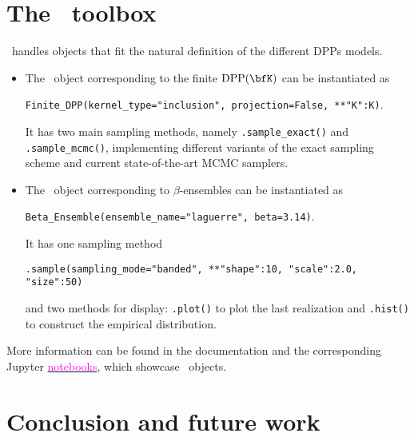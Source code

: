 \documentclass[twoside,11pt]{article}
\begin{document}



\section{The \DPPy\ toolbox} %
\label{sec:the_dppy_toolbox}

  \DPPy\ handles objects that fit the natural definition of the different DPPs models.
  \begin{itemize}
	  \item The \DPPy\ object corresponding to the finite $\DPP(\bfK)$ can be instantiated as
	  \begin{nscenter}
	  	\texttt{Finite_DPP(kernel_type="inclusion", projection=False, **{"K":K})}.
	  \end{nscenter}
		It has two main sampling methods, namely \texttt{.sample_exact()} and \texttt{.sample_mcmc()}, implementing different variants of the exact sampling scheme and current state-of-the-art MCMC samplers.

		\item The \DPPy\ object corresponding to $\beta$-ensembles can be instantiated as
		\begin{nscenter}
			\texttt{Beta_Ensemble(ensemble_name="laguerre", beta=3.14)}.
		\end{nscenter}
		It has one sampling method
		\begin{nscenter}
			\texttt{.sample(sampling_mode="banded", **{"shape":10, "scale":2.0, "size":50})}
		\end{nscenter}
		and two methods for display: \texttt{.plot()} to plot the last realization and \texttt{.hist()} to construct the empirical distribution.
  \end{itemize}
  More information can be found in the documentation and the corresponding Jupyter \href{https://github.com/guilgautier/DPPy/tree/master/notebooks}{\textcolor{magenta}{notebooks}}, which showcase \DPPy\ objects.


\section{Conclusion and future work} %
\label{sec:conclusion_and_future_work}
\end{document}
